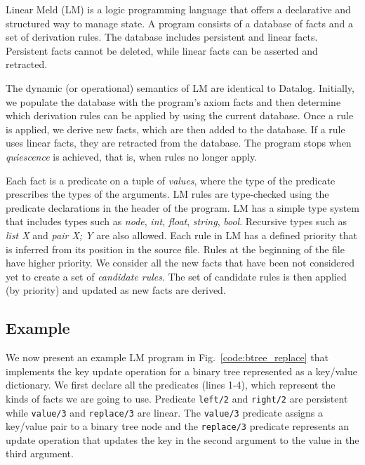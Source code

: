 \newcommand{\selector}[0]{[~S~\Rightarrow~y;~BE~] \lolli HE}
\newcommand{\comprehension}[0]{\{~\widehat{x};~BE;~SH~\}}
\newcommand{\aggregate}[0]{[~A~\Rightarrow~y;~\widehat{x};~BE;~SH_1;~SH_2~]}

Linear Meld (LM) is a logic programming language that offers a declarative and structured way to manage state.
A program consists of a database of facts and a set of derivation rules. The database includes persistent
and linear facts. Persistent facts cannot be deleted, while linear facts can be asserted and retracted.

The dynamic (or operational) semantics of LM are identical to Datalog.
Initially, we populate the database with the program's axiom facts and then determine which derivation rules can be applied by using the current database. Once a rule is applied, we derive new facts, which are then added to the database.
If a rule uses linear facts, they are retracted from the database.
The program stops when \emph{quiescence} is achieved, that is, when rules no longer apply.

Each fact is a predicate on a tuple of \emph{values}, where the type of the predicate prescribes the types of the arguments.
LM rules are type-checked using the predicate declarations in the header of the program. LM has a simple type system that includes types such as
\emph{node}, \emph{int}, \emph{float}, \emph{string}, \emph{bool}. Recursive types such as \emph{list X} and \emph{pair X; Y} are
also allowed.
Each rule in LM has a defined priority that is inferred from its position in the source file.
Rules at the beginning of the file have higher priority. We consider all
the new facts that have been not considered yet to create a set of \emph{candidate rules}.
The set of candidate rules is then applied (by priority) and updated as new facts are derived.

\subsection{Example}

We now present an example LM program in Fig.~\ref{code:btree_replace} that implements the key update operation for a binary tree
represented as a key/value dictionary.
We first declare all the predicates (lines 1-4), which represent the kinds of facts we are going to use.
Predicate \texttt{left/2} and \texttt{right/2} are persistent while \texttt{value/3} and \texttt{replace/3} are linear.
The \texttt{value/3} predicate assigns a key/value pair to a binary tree node and the \texttt{replace/3} predicate
represents an update operation that updates the key in the second argument to the value in the third argument.


